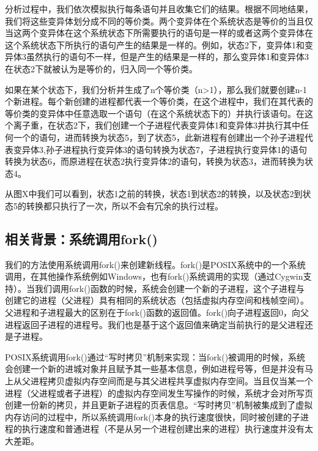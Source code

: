 \documentclass[nofonts]{ctexrep}
\begin{document}
分析过程中，我们依次模拟执行每条语句并且收集它们的结果。根据不同地结果，我们将这些变异体划分成不同的等价类。两个变异体在个系统状态是等价的当且仅当这两个变异体在这个系统状态下所需要执行的语句是一样的或者这两个变异体在这个系统状态下所执行的语句产生的结果是一样的。例如，状态2下，变异体1和变异体3虽然执行的语句不一样，但是产生的结果是一样的，那么变异体1和变异体3在状态2下就被认为是等价的，归入同一个等价类。

如果在某个状态下，我们分析并生成了n个等价类（n>1），那么我们就要创建n-1个新进程。每个新创建的进程都代表一个等价类，在这个进程中，我们在其代表的等价类的变异体中任意选取一个语句（在这个系统状态下的）并执行该语句。在这个离子重，在状态2下，我们创建一个子进程代表变异体1和变异体3并执行其中任何一个的语句，进而转换为状态5，到了状态5，此新进程有创建出一个孙子进程代表变异体3,孙子进程执行变异体3的语句转换为状态7，子进程执行变异体1的语句转换为状态6，而原进程在状态2执行变异体2的语句，转换为状态3，进而转换为状态4。

从图X中我们可以看到，状态1之前的转换，状态1到状态2的转换，以及状态2到状态5的转换都只执行了一次，所以不会有冗余的执行过程。


\subsection{相关背景：系统调用fork()}
我们的方法使用系统调用fork()来创建新线程。fork()是POSIX系统中的一个系统调用，在其他操作系统例如Windows，也有fork()系统调用的实现（通过Cygwin支持）。当我们调用fork()函数的时候，系统会创建一个新的子进程，这个子进程与创建它的进程（父进程）具有相同的系统状态（包括虚拟内存空间和栈帧空间）。父进程和子进程最大的区别在于fork()函数的返回值。fork()向子进程返回0，向父进程返回子进程的进程号。我们也是基于这个返回值来确定当前执行的是父进程还是子进程。

POSIX系统调用fork()通过``写时拷贝''机制来实现：当fork()被调用的时候，系统会创建一个新的进城对象并且赋予其一些基本信息，例如进程号等，但是并没有马上从父进程拷贝虚拟内存空间而是与其父进程共享虚拟内存空间。当且仅当某一个进程（父进程或者子进程）的虚拟内存空间发生写操作的时候，系统才会对所写页创建一份新的拷贝，并且更新子进程的页表信息。``写时拷贝''机制被集成到了虚拟内存访问的过程中，所以系统调用fork()本身的执行速度很快，同时被创建的子进程的执行速度和普通进程（不是从另一个进程创建出来的进程）执行速度并没有太大差距。
\end{document}
